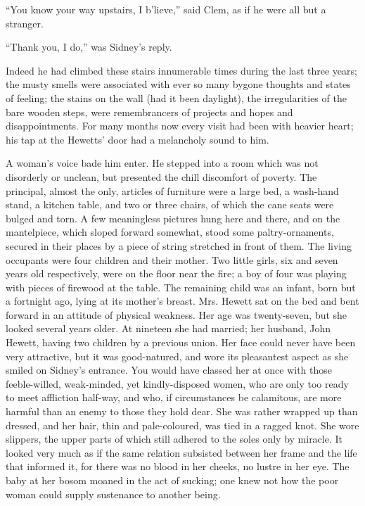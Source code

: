 ``You know your way upstairs, I b'lieve,'' said Clem, as if he were all
but a stranger.

``Thank you, I do,'' was Sidney's reply.

Indeed he had climbed these stairs innumerable times during the last
three years; the musty smells were associated with ever so many bygone
thoughts and states of feeling; the stains on the wall (had it been
daylight), the irregularities of the bare wooden steps, were
remembrancers of projects and hopes and disappointments. For many months
now every visit had been with heavier heart; his tap at the Hewetts'
door had a melancholy sound to him.

A woman's voice bade him enter. He stepped into a room which was not
disorderly or unclean, but presented the chill discomfort of poverty.
The principal, almost the only, articles of furniture were a large bed,
a {\protect\hypertarget{36}{}{}}wash-hand stand, a kitchen table, and
two or three chairs, of which the cane seats were bulged and torn. A few
meaningless pictures hung here and there, and on the mantelpiece, which
sloped forward somewhat, stood some paltry-ornaments, secured in their
places by a piece of string stretched in front of them. The living
occupants were four children and their mother. Two little girls, six and
seven years old respectively, were on the floor near the fire; a boy of
four was playing with pieces of firewood at the table. The remaining
child was an infant, born but a fortnight ago, lying at its mother's
breast. Mrs. Hewett sat on the bed and bent forward in an attitude of
physical weakness. Her age was twenty-seven, but she looked several
years older. At nineteen she had married; her husband, John Hewett,
having two children by a previous union. Her face could never have been
very attractive, but it was good-natured, and wore its pleasantest
aspect as she smiled on Sidney's entrance. You would have classed her at
once with those {\protect\hypertarget{37}{}{}}feeble-willed,
weak-minded, yet kindly-disposed women, who are only too ready to meet
affliction half-way, and who, if circumstances be calamitous, are more
harmful than an enemy to those they hold dear. She was rather wrapped up
than dressed, and her hair, thin and pale-coloured, was tied in a ragged
knot. She wore slippers, the upper parts of which still adhered to the
soles only by miracle. It looked very much as if the same relation
subsisted between her frame and the life that informed it, for there was
no blood in her cheeks, no lustre in her eye. The baby at her bosom
moaned in the act of sucking; one knew not how the poor woman could
supply sustenance to another being.


